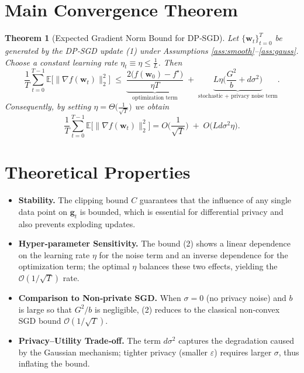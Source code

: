 \documentclass{article}
\newtheorem{theorem}{Theorem}
\begin{document}
\section*{Main Convergence Theorem}
\begin{theorem}[Expected Gradient Norm Bound for DP‑SGD]\label{thm:main}
Let $\{\mathbf{w}_t\}_{t=0}^{T}$ be generated by the DP‑SGD update (1) under Assumptions \ref{ass:smooth}–\ref{ass:gauss}. Choose a constant learning rate $\eta_t\equiv\eta\le\frac{1}{L}$. Then
\[
\frac{1}{T}\sum_{t=0}^{T-1}\mathbb{E}\big[\|\nabla f(\mathbf{w}_t)\|_2^{2}\big]
\;\le\;
\underbrace{\frac{2\big(f(\mathbf{w}_0)-f^\star\big)}{\eta T}}_{\text{optimization term}}
\;+\;
\underbrace{L\eta\Big(\frac{G^{2}}{b}+d\sigma^{2}\Big)}_{\text{stochastic + privacy noise term}} .
\tag{2}
\]
Consequently, by setting $\eta=\Theta\!\big(\frac{1}{\sqrt{T}}\big)$ we obtain
\[
\frac{1}{T}\sum_{t=0}^{T-1}\mathbb{E}\big[\|\nabla f(\mathbf{w}_t)\|_2^{2}\big]=O\!\Big(\frac{1}{\sqrt{T}}\Big)
\;+\;O\!\big(Ld\sigma^{2}\eta\big).
\]
\end{theorem}

\section*{Theoretical Properties}
\begin{itemize}
\item \textbf{Stability.} The clipping bound $C$ guarantees that the influence of any single data point on $\mathbf{g}_t$ is bounded, which is essential for differential privacy and also prevents exploding updates.
\item \textbf{Hyper‑parameter Sensitivity.} The bound (2) shows a linear dependence on the learning rate $\eta$ for the noise term and an inverse dependence for the optimization term; the optimal $\eta$ balances these two effects, yielding the $\mathcal{O}(1/\sqrt{T})$ rate.
\item \textbf{Comparison to Non‑private SGD.} When $\sigma=0$ (no privacy noise) and $b$ is large so that $G^{2}/b$ is negligible, (2) reduces to the classical non‑convex SGD bound $\mathcal{O}(1/\sqrt{T})$.
\item \textbf{Privacy–Utility Trade‑off.} The term $d\sigma^{2}$ captures the degradation caused by the Gaussian mechanism; tighter privacy (smaller $\varepsilon$) requires larger $\sigma$, thus inflating the bound.
\end{itemize}
\end{document}
